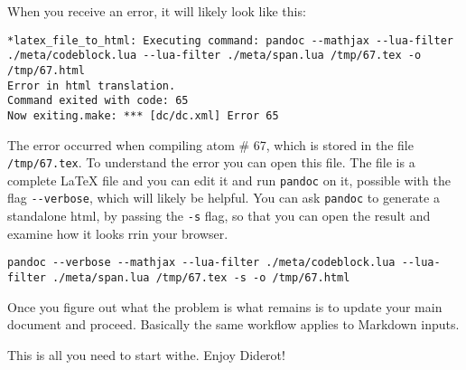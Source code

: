 When you receive an error, it will likely look like this:
\begin{lstlisting}
*latex_file_to_html: Executing command: pandoc --mathjax --lua-filter ./meta/codeblock.lua --lua-filter ./meta/span.lua /tmp/67.tex -o /tmp/67.html
Error in html translation.
Command exited with code: 65
Now exiting.make: *** [dc/dc.xml] Error 65
\end{lstlisting} 
% 
The error occurred when compiling atom \# 67, which is stored in the file \lstinline`/tmp/67.tex`.
%
To understand the error you can open this file.  The file is a complete LaTeX file and you can edit it and run \lstinline`pandoc` on it, possible with the flag \lstinline`--verbose`, which will likely be helpful.
%
You can ask \lstinline`pandoc` to generate a standalone html, by passing the \lstinline`-s` flag, so that you can open the result and examine how it looks rrin your browser.
%
\begin{lstlisting}
pandoc --verbose --mathjax --lua-filter ./meta/codeblock.lua --lua-filter ./meta/span.lua /tmp/67.tex -s -o /tmp/67.html
\end{lstlisting}
%
Once you figure out what the problem is what remains is to update your main document and proceed.
%
Basically the same workflow applies to Markdown inputs.


This is all you need to start withe.  Enjoy Diderot!
